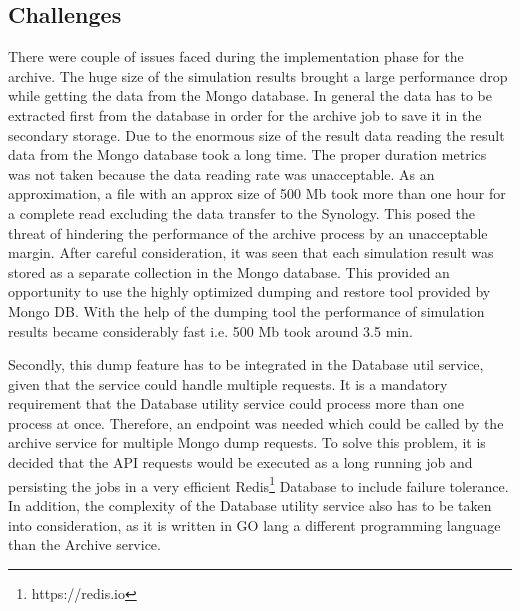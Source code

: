 \subsection{Challenges}
There were couple of issues faced during the implementation phase for the archive. The huge size of the simulation results brought a large
performance drop while getting the data from the Mongo database. In general the data has to be extracted first from the database in order for the archive job
to save it in the secondary storage. Due to the enormous size of the result data reading the result data from the Mongo database took a long time. The proper duration
metrics was not taken because the data reading rate was unacceptable. As an approximation, a file with an approx size of 500 Mb took more than one hour 
for a complete read excluding the data transfer to the Synology. This posed the threat of hindering the performance of the archive process by an unacceptable margin.
After careful consideration, it was seen that each simulation result was stored as a separate collection in the Mongo database. This provided an opportunity to use
the highly optimized dumping and restore tool provided by Mongo DB. With the help of the dumping tool the performance of simulation results became considerably fast i.e.
500 Mb took around 3.5 min.

Secondly, this dump feature has to be integrated in the Database util service, given that the service could handle multiple requests. It is a mandatory requirement that the Database
utility service could process more than one process at once. Therefore, an endpoint was needed which could be called by the archive service for multiple Mongo dump
requests. To solve this problem, it is decided that the API requests would be executed as a long running job and persisting the jobs in a very efficient 
Redis\footnote{https://redis.io} Database to include failure tolerance. In addition, the complexity of the Database utility service also has to be taken into consideration, as it 
is written in GO lang a different programming language than the Archive service.

